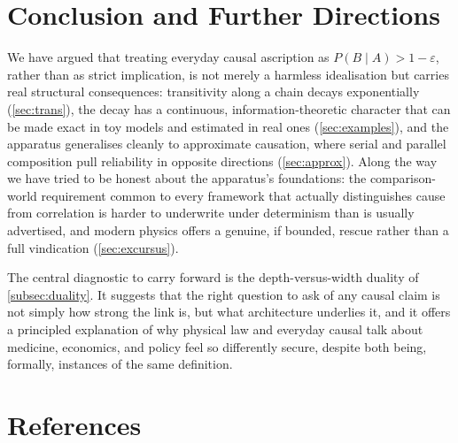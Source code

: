\documentclass[11pt]{article}
\theoremstyle{definition}
\newcommand{\eps}{\varepsilon}
\begin{document}
\section{Conclusion and Further Directions}
\label{sec:conclusion}

We have argued that treating everyday causal ascription as $P(B\mid A) > 1-\eps$, rather than as strict implication, is not merely a harmless idealisation but carries real structural consequences: transitivity along a chain decays exponentially (\cref{sec:trans}), the decay has a continuous, information-theoretic character that can be made exact in toy models and estimated in real ones (\cref{sec:examples}), and the apparatus generalises cleanly to approximate causation, where serial and parallel composition pull reliability in opposite directions (\cref{sec:approx}). Along the way we have tried to be honest about the apparatus's foundations: the comparison-world requirement common to every framework that actually distinguishes cause from correlation is harder to underwrite under determinism than is usually advertised, and modern physics offers a genuine, if bounded, rescue rather than a full vindication (\cref{sec:excursus}).

The central diagnostic to carry forward is the depth-versus-width duality of \cref{subsec:duality}. It suggests that the right question to ask of any causal claim is not simply how strong the link is, but what architecture underlies it, and it offers a principled explanation of why physical law and everyday causal talk about medicine, economics, and policy feel so differently secure, despite both being, formally, instances of the same definition.

\clearpage
\section*{References}
\end{document}
